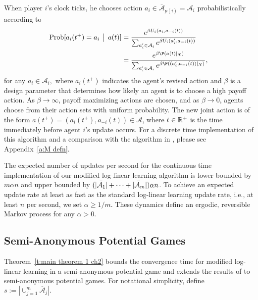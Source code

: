 When player $i$'s clock ticks, he chooses action $a_i\in \bar{\mathcal{A}}_{p(i)} = \mathcal{A}_i$ probabilistically according to
\begin{align}\label{e:logit response}
{\rm Prob}[a_i(t^+) = a_i\given a(t)]  &=  \frac{e^{\beta U_i(a_i,a_{-i}(t))}}{\sum_{a_i^{\prime} \in\mathcal{A}_i}e^{\beta U_i(a_i^\prime,a_{-i}(t))}} \nonumber\\
&=  \frac{e^{\beta\P(a(t)|_\X)}}{\sum_{a_i^{\prime} \in\mathcal{A}_i} e^{\beta\P((a_i^{\prime},a_{-i}(t))|_\X)}},
\end{align}
for any $a_i\in \mathcal{A}_i,$ where $a_i(t^+)$ indicates the agent's revised action and $\beta$ is a design parameter that determines how likely an agent is to choose a high payoff action. As $\beta\to \infty$, payoff maximizing actions are chosen, and as $\beta\to 0$, agents choose from their action sets with uniform probability.  The new joint action is of the form $a(t^+) = (a_i(t^+), a_{-i}(t))\in \mathcal{A}$, where $t\in\mathbb{R}^+$ is the time immediately before agent $i$'s update occurs. For a discrete time implementation of this algorithm and a comparison with the algorithm in \cite{Shah2010}, please see Appendix~\ref{a:M defn}.


The expected number of updates per second for the continuous time implementation of our modified log-linear learning algorithm is lower bounded by $m\alpha n$ and upper bounded by $(|\bar{{\cal A}}_1| + \dots + |\bar{{\cal A}}_m|) \alpha n$.  
To achieve an expected update rate at least as fast as the standard log-linear learning update rate, i.e., at least $n$ per second, we set $\alpha \geq 1/m$.  These dynamics define an ergodic, reversible Markov process for any $\alpha>0$.  

\subsection{Semi-Anonymous Potential Games}\label{s:main theorem 1}

Theorem~\ref{t:main theorem 1 ch2} bounds the convergence time for modified log-linear learning in a semi-anonymous potential game and extends the results of \cite{Shah2010} to semi-anonymous potential games. For notational simplicity, define $s:= |\cup_{j= 1}^m \overline{\mathcal{A}}_j|.$  

\firsttheorem*


